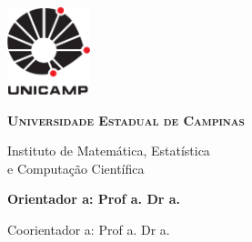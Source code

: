 \thispagestyle{plain}
\includegraphics[width=.94in, height=1in,
keepaspectratio=true]{figuras/unicamp-logo}
\begin{center}
  {\large \scshape \bfseries Universidade Estadual de Campinas
  \vspace{.5cm}

  Instituto de Matemática, Estatística \\
  e Computação Científica}
\end{center}
\vspace{.7cm}
\begin{center}
  {\large \scshape \bfseries \autor}
\end{center}
\vspace{.7cm}
\begin{center}
  {\Large \scshape \bfseries \titulo}
\end{center}
\vspace{.8cm}
{\bfseries
\noindent
Orientador\ifx\femaleOrientador\undefined
\else
a\fi: Prof\ifx\femaleOrientador\undefined
\else
a\fi. Dr\ifx\femaleOrientador\undefined
\else
a\fi. \orientador
\vspace{.25cm}

\ifx\coorientador\undefined
\else
\noindent
Coorientador\ifx\femaleCoorientador\undefined
\else
a\fi: Prof\ifx\femaleCoorientador\undefined
\else
a\fi. Dr\ifx\femaleCoorientador\undefined
\else
a\fi. \coorientador
\fi
}

